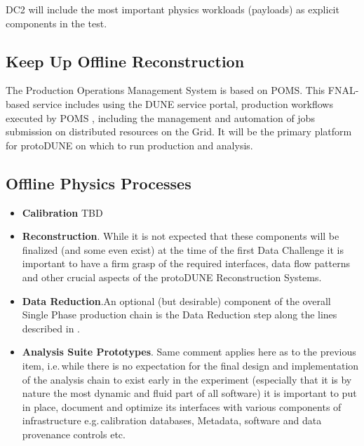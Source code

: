 \documentclass[pdftex,12pt,letter]{article}
\newcommand{\pd}{protoDUNE\xspace}
\newcommand{\singp}{Single Phase\xspace}
\begin{document}
DC2 will include the most important physics workloads (payloads) as explicit components in the test.

\subsection{Keep Up Offline Reconstruction}

The Production Operations Management System is based on POMS. This FNAL-based service includes using the DUNE service portal, production workflows executed by POMS \cite{poms}, including the management and automation of  jobs
submission on distributed resources on the Grid. It will be the primary platform for \pd on which to run production and analysis.

\subsection{Offline Physics Processes}
\begin{itemize}
\item \textbf{Calibration}  TBD
 \item \textbf{Reconstruction}. While it is not expected that these components will be finalized
(and some even exist) at the time of the first Data Challenge it is important to have a firm grasp of the required interfaces,
data flow patterns and other crucial aspects of the \pd Reconstruction Systems.
\item \textbf{Data Reduction}.An optional (but desirable)  component of the overall \singp production chain is the Data Reduction step along the lines described
in \cite{docdb2089}.
\item \textbf{Analysis Suite Prototypes}. Same comment applies here as to the previous item, i.e.\,while there is no expectation
for the final design and implementation of the analysis chain to exist early in the experiment (especially that it is by nature the most
dynamic and fluid part of all software) it is important to put in place, document and optimize its interfaces with various components
of infrastructure e.g.\,calibration databases, Metadata, software and data provenance controls etc.
\end{itemize}
\end{document}

